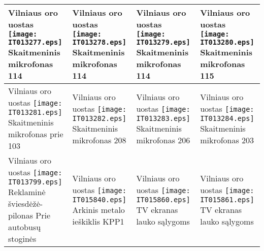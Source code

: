 \documentclass[a4paper,12pt]{article}
\begin{document}
\begin{supertabular}{|p{4.2cm}|p{4.2cm}|p{4.2cm}|p{4.2cm}|}
Vilniaus oro uostas \newline \texttt{[image: IT013277.eps]} \newline Skaitmeninis mikrofonas \newline \footnotesize {114} & Vilniaus oro uostas \newline \texttt{[image: IT013278.eps]} \newline Skaitmeninis mikrofonas \newline \footnotesize {114} & Vilniaus oro uostas \newline \texttt{[image: IT013279.eps]} \newline Skaitmeninis mikrofonas \newline \footnotesize {114} & Vilniaus oro uostas \newline \texttt{[image: IT013280.eps]} \newline Skaitmeninis mikrofonas \newline \footnotesize {115}\\\hline
Vilniaus oro uostas \newline \texttt{[image: IT013281.eps]} \newline Skaitmeninis mikrofonas \newline \footnotesize {prie 103} & Vilniaus oro uostas \newline \texttt{[image: IT013282.eps]} \newline Skaitmeninis mikrofonas \newline \footnotesize {208} & Vilniaus oro uostas \newline \texttt{[image: IT013283.eps]} \newline Skaitmeninis mikrofonas \newline \footnotesize {206} & Vilniaus oro uostas \newline \texttt{[image: IT013284.eps]} \newline Skaitmeninis mikrofonas \newline \footnotesize {203}\\\hline
Vilniaus oro uostas \newline \texttt{[image: IT013799.eps]} \newline Reklaminė šviesdėžė-pilonas \newline \footnotesize {Prie autobusų stoginės} & Vilniaus oro uostas \newline \texttt{[image: IT015840.eps]} \newline Arkinis metalo ieškiklis \newline \footnotesize {KPP1} & Vilniaus oro uostas \newline \texttt{[image: IT015860.eps]} \newline TV ekranas lauko sąlygoms \newline \footnotesize {} & Vilniaus oro uostas \newline \texttt{[image: IT015861.eps]} \newline TV ekranas lauko sąlygoms \newline \footnotesize {}\\\hline

\end{supertabular}
\end{document}
